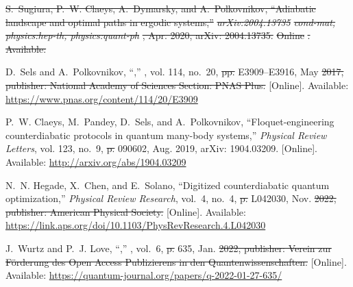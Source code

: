 \documentclass[a4paper,oneside,11pt]{book}
\providecommand{\DIFaddtex}[1]{{\protect\color{blue}\uwave{#1}}} %
\providecommand{\DIFdeltex}[1]{{\protect\color{red}\sout{#1}}}                      %
\providecommand{\DIFaddbegin}{} %
\providecommand{\DIFaddend}{} %
\providecommand{\DIFdelbegin}{} %
\providecommand{\DIFdelend}{} %
\providecommand{\DIFadd}[1]{\texorpdfstring{\DIFaddtex{#1}}{#1}} %
\providecommand{\DIFdel}[1]{\texorpdfstring{\DIFdeltex{#1}}{}} %
\newcommand{\DIFscaledelfig}{0.5}
\newlength{\DIFdelgraphicswidth} %
\newlength{\DIFdelgraphicsheight} %
\newcommand{\DIFaddincludegraphics}[2][]{{\color{blue}\fbox{\DIFOincludegraphics[#1]{#2}}}} %
\newcommand{\DIFdelincludegraphics}[2][]{%
\sbox{\DIFdelgraphicsbox}{\DIFOincludegraphics[#1]{#2}}%
\settoboxwidth{\DIFdelgraphicswidth}{\DIFdelgraphicsbox} %
\settoboxtotalheight{\DIFdelgraphicsheight}{\DIFdelgraphicsbox} %
\scalebox{\DIFscaledelfig}{%
\parbox[b]{\DIFdelgraphicswidth}{\usebox{\DIFdelgraphicsbox}\\[-\baselineskip] \rule{\DIFdelgraphicswidth}{0em}}\llap{\resizebox{\DIFdelgraphicswidth}{\DIFdelgraphicsheight}{%
\setlength{\unitlength}{\DIFdelgraphicswidth}%
\begin{picture}(1,1)%
\thicklines\linethickness{2pt} %
{\color[rgb]{1,0,0}\put(0,0){\framebox(1,1){}}}%
{\color[rgb]{1,0,0}\put(0,0){\line( 1,1){1}}}%
{\color[rgb]{1,0,0}\put(0,1){\line(1,-1){1}}}%
\end{picture}%
}\hspace*{3pt}}} %
} %
\DeclareRobustCommand{\DIFaddbegin}{\DIFOaddbegin \let\includegraphics\DIFaddincludegraphics} %
\DeclareRobustCommand{\DIFaddend}{\DIFOaddend \let\includegraphics\DIFOincludegraphics} %
\DeclareRobustCommand{\DIFdelbegin}{\DIFOdelbegin \let\includegraphics\DIFdelincludegraphics} %
\DeclareRobustCommand{\DIFdelend}{\DIFOaddend \let\includegraphics\DIFOincludegraphics} %
\begin{document}
\begin{thebibliography}{100}
\DIFdelbegin {}
\DIFdel{S.~Sugiura, P.~W. Claeys, A.~Dymarsky, and A.~Polkovnikov, ``Adiabatic
  landscape and optimal paths in ergodic systems,'' }\emph{\DIFdel{arXiv:2004.13735
  }%
\DIFdel{cond-mat, physics:hep-th, physics:quant-ph}%
}%
\DIFdel{, Apr. 2020, arXiv: 2004.13735.
  }%
\DIFdel{Online}%
\DIFdel{. Available: }%

\DIFdelend {}
\BIBentryALTinterwordspacing
D.~Sels and A.~Polkovnikov, ``,''
  \emph{}, vol. 114, no.~20,  \DIFdelbegin \DIFdel{pp. }\DIFdelend E3909--E3916, May \DIFdelbegin \DIFdel{2017, publisher: National
  Academy of Sciences Section: PNAS Plus. }\DIFdelend \DIFaddbegin \DIFadd{2017. }\DIFaddend [Online]. Available:
  \url{https://www.pnas.org/content/114/20/E3909}
\BIBentrySTDinterwordspacing

\BIBentryALTinterwordspacing
P.~W. Claeys, M.~Pandey, D.~Sels, and A.~Polkovnikov, ``Floquet-engineering
  counterdiabatic protocols in quantum many-body systems,'' \emph{Physical
  Review Letters}, vol. 123, no.~9,  \DIFdelbegin \DIFdel{p. }\DIFdelend 090602, Aug. 2019, arXiv: 1904.03209.
  [Online]. Available: \url{http://arxiv.org/abs/1904.03209}
\BIBentrySTDinterwordspacing

\BIBentryALTinterwordspacing
N.~N. Hegade, X.~Chen, and E.~Solano, ``Digitized counterdiabatic quantum
  optimization,'' \emph{Physical Review Research}, vol.~4, no.~4,  \DIFdelbegin \DIFdel{p. }\DIFdelend L042030,
  Nov. \DIFdelbegin \DIFdel{2022, publisher: American Physical Society. }\DIFdelend \DIFaddbegin \DIFadd{2022. }\DIFaddend [Online]. Available:
  \url{https://link.aps.org/doi/10.1103/PhysRevResearch.4.L042030}
\BIBentrySTDinterwordspacing

\BIBentryALTinterwordspacing
J.~Wurtz and P.~J. Love, ``,''
  \emph{}, vol.~6,  \DIFdelbegin \DIFdel{p. }\DIFdelend 635, Jan. \DIFdelbegin \DIFdel{2022,
  publisher: Verein zur Förderung des Open Access Publizierens in den
  Quantenwissenschaften. }\DIFdelend \DIFaddbegin \DIFadd{2022.
  }\DIFaddend [Online]. Available:
  \url{https://quantum-journal.org/papers/q-2022-01-27-635/}
\BIBentrySTDinterwordspacing


\end{thebibliography}
\end{document}
